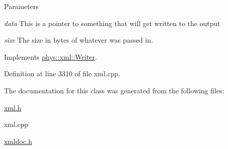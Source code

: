 \begin{DoxyParams}{Parameters}
\item[{\em data}]This is a pointer to something that will get written to the output \item[{\em size}]The size in bytes of whatever was passed in. \end{DoxyParams}


Implements \hyperlink{classphys_1_1xml_1_1Writer_ab6d4758ab53743f236eb64d5b2dd7e9e}{phys::xml::Writer}.



Definition at line 3310 of file xml.cpp.



The documentation for this class was generated from the following files:\begin{DoxyCompactItemize}
\item 
\hyperlink{xml_8h}{xml.h}\item 
xml.cpp\item 
\hyperlink{xmldoc_8h}{xmldoc.h}\end{DoxyCompactItemize}

